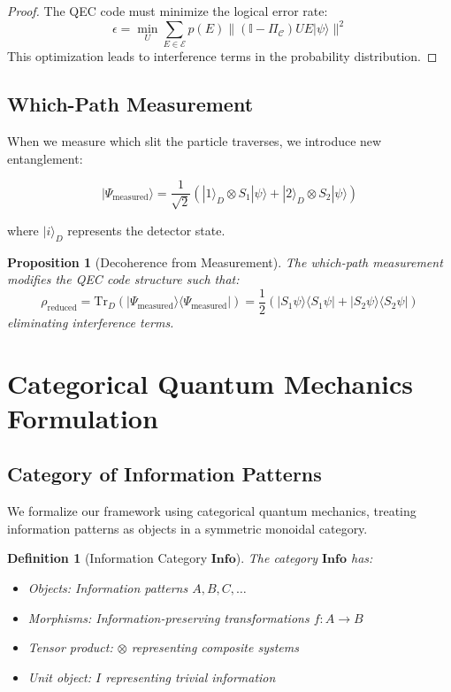 \documentclass[12pt,a4paper]{article}
\newtheorem{proposition}[theorem]{Proposition}
\newtheorem{definition}[theorem]{Definition}
\begin{document}
\begin{proof}
The QEC code must minimize the logical error rate:
\begin{equation}
\epsilon = \min_{U} \sum_{E \in \mathcal{E}} p(E) \|(\mathbb{I} - \Pi_{\mathcal{C}})UE|\psi\rangle\|^2
\end{equation}
This optimization leads to interference terms in the probability distribution.
\end{proof}

\subsection{Which-Path Measurement}

When we measure which slit the particle traverses, we introduce new entanglement:

\begin{equation}
|\Psi_{\text{measured}}\rangle = \frac{1}{\sqrt{2}}(|1\rangle_D \otimes S_1|\psi\rangle + |2\rangle_D \otimes S_2|\psi\rangle)
\end{equation}

where $|i\rangle_D$ represents the detector state.

\begin{proposition}[Decoherence from Measurement]
The which-path measurement modifies the QEC code structure such that:
\begin{equation}
\rho_{\text{reduced}} = \text{Tr}_D(|\Psi_{\text{measured}}\rangle\langle\Psi_{\text{measured}}|) = \frac{1}{2}(|S_1\psi\rangle\langle S_1\psi| + |S_2\psi\rangle\langle S_2\psi|)
\end{equation}
eliminating interference terms.
\end{proposition}

\section{Categorical Quantum Mechanics Formulation}

\subsection{Category of Information Patterns}

We formalize our framework using categorical quantum mechanics, treating information patterns as objects in a symmetric monoidal category.

\begin{definition}[Information Category $\mathbf{Info}$]
The category $\mathbf{Info}$ has:
\begin{itemize}
\item Objects: Information patterns $A, B, C, \ldots$
\item Morphisms: Information-preserving transformations $f: A \rightarrow B$
\item Tensor product: $\otimes$ representing composite systems
\item Unit object: $I$ representing trivial information
\end{itemize}
\end{definition}
\end{document}
